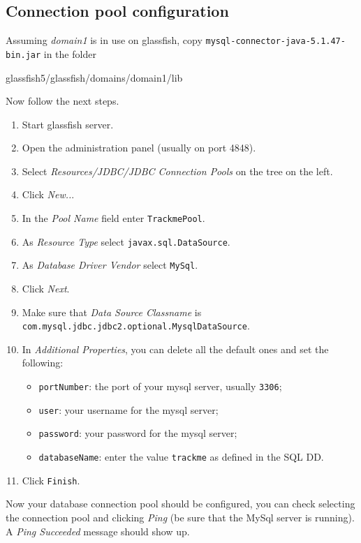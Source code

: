 \subsection{Connection pool configuration}
Assuming \textit{domain1} is in use on glassfish, copy \texttt{mysql-connector-java-5.1.47-bin.jar} in the folder

\begin{center}
glassfish5/glassfish/domains/domain1/lib
\end{center}
Now follow the next steps.
\begin{enumerate}
\item Start glassfish server.
\item Open the administration panel (usually on port 4848).
\item Select \textit{Resources/JDBC/JDBC Connection Pools} on the tree on the left.
\item Click \textit{New..}.
\item In the \textit{Pool Name} field enter \texttt{TrackmePool}.
\item As \textit{Resource Type} select \texttt{javax.sql.DataSource}.
\item As \textit{Database Driver Vendor} select \texttt{MySql}.
\item Click \textit{Next}.
\item Make sure that \textit{Data Source Classname} is \texttt{com.mysql.jdbc.jdbc2.optional.MysqlDataSource}.
\item In \textit{Additional Properties}, you can delete all the default ones and set the following:
	\begin{itemize}
	\item \texttt{portNumber}: the port of your mysql server, usually \texttt{3306};
	\item \texttt{user}: your username for the mysql server;
	\item	\texttt{password}: your password for the mysql server;
	\item \texttt{databaseName}: enter the value \texttt{trackme} as defined in the SQL DD.
	\end{itemize}
\item Click \texttt{Finish}.
\end{enumerate}
Now your database connection pool should be configured, you can check selecting the connection pool and clicking \textit{Ping} (be sure that the MySql server is running).
A \textit{Ping Succeeded} message should show up.\vspace{1em}


